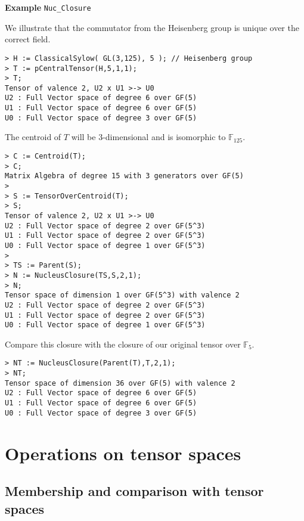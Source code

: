 \begin{framed}{\bf Example} {\tt Nuc\_Closure}\\
{\small We illustrate that the commutator from the Heisenberg group is unique over the correct field.
\begin{lstlisting}[frame=single,basicstyle=\ttfamily\color{black!30!
teal},backgroundcolor=\color{white!70!gray}]
> H := ClassicalSylow( GL(3,125), 5 ); // Heisenberg group
> T := pCentralTensor(H,5,1,1);
> T;
Tensor of valence 2, U2 x U1 >-> U0
U2 : Full Vector space of degree 6 over GF(5)
U1 : Full Vector space of degree 6 over GF(5)
U0 : Full Vector space of degree 3 over GF(5)
\end{lstlisting}
The centroid of $T$ will be 3-dimensional and is isomorphic to $\mathbb{F}_{125}$.
\begin{lstlisting}[frame=single,basicstyle=\ttfamily\color{black!30!
teal},backgroundcolor=\color{white!70!gray}]
> C := Centroid(T);
> C;
Matrix Algebra of degree 15 with 3 generators over GF(5)
> 
> S := TensorOverCentroid(T);
> S;
Tensor of valence 2, U2 x U1 >-> U0
U2 : Full Vector space of degree 2 over GF(5^3)
U1 : Full Vector space of degree 2 over GF(5^3)
U0 : Full Vector space of degree 1 over GF(5^3)
> 
> TS := Parent(S);
> N := NucleusClosure(TS,S,2,1);
> N;
Tensor space of dimension 1 over GF(5^3) with valence 2
U2 : Full Vector space of degree 2 over GF(5^3)
U1 : Full Vector space of degree 2 over GF(5^3)
U0 : Full Vector space of degree 1 over GF(5^3)
\end{lstlisting} 
Compare this closure with the closure of our original tensor over $\mathbb{F}_5$.
\begin{lstlisting}[frame=single,basicstyle=\ttfamily\color{black!30!
teal},backgroundcolor=\color{white!70!gray}]
> NT := NucleusClosure(Parent(T),T,2,1);
> NT;
Tensor space of dimension 36 over GF(5) with valence 2
U2 : Full Vector space of degree 6 over GF(5)
U1 : Full Vector space of degree 6 over GF(5)
U0 : Full Vector space of degree 3 over GF(5)
\end{lstlisting} }
\end{framed}


\section{Operations on tensor spaces}

\subsection{Membership and comparison with tensor spaces}


